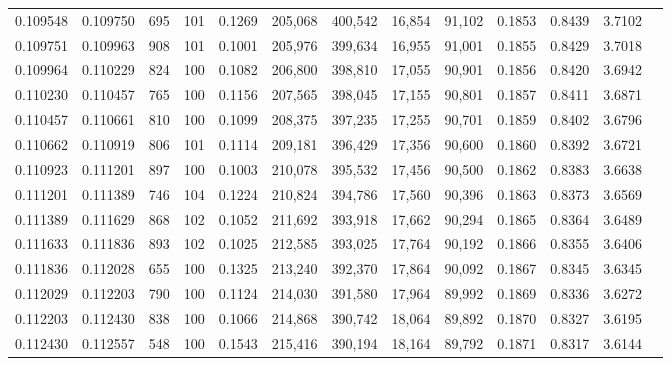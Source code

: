 \begin{tabular}{rrrrrrrrrrrrr}
0.109548 & 0.109750 &   695 & 101 &                                     0.1269 & 205,068 & 400,542 &  16,854 &  91,102 & 0.1853 & 0.8439 & 3.7102 \\
0.109751 & 0.109963 &   908 & 101 &                                     0.1001 & 205,976 & 399,634 &  16,955 &  91,001 & 0.1855 & 0.8429 & 3.7018 \\
0.109964 & 0.110229 &   824 & 100 &                                     0.1082 & 206,800 & 398,810 &  17,055 &  90,901 & 0.1856 & 0.8420 & 3.6942 \\
0.110230 & 0.110457 &   765 & 100 &                                     0.1156 & 207,565 & 398,045 &  17,155 &  90,801 & 0.1857 & 0.8411 & 3.6871 \\
0.110457 & 0.110661 &   810 & 100 &                                     0.1099 & 208,375 & 397,235 &  17,255 &  90,701 & 0.1859 & 0.8402 & 3.6796 \\
0.110662 & 0.110919 &   806 & 101 &                                     0.1114 & 209,181 & 396,429 &  17,356 &  90,600 & 0.1860 & 0.8392 & 3.6721 \\
0.110923 & 0.111201 &   897 & 100 &                                     0.1003 & 210,078 & 395,532 &  17,456 &  90,500 & 0.1862 & 0.8383 & 3.6638 \\
0.111201 & 0.111389 &   746 & 104 &                                     0.1224 & 210,824 & 394,786 &  17,560 &  90,396 & 0.1863 & 0.8373 & 3.6569 \\
0.111389 & 0.111629 &   868 & 102 &                                     0.1052 & 211,692 & 393,918 &  17,662 &  90,294 & 0.1865 & 0.8364 & 3.6489 \\
0.111633 & 0.111836 &   893 & 102 &                                     0.1025 & 212,585 & 393,025 &  17,764 &  90,192 & 0.1866 & 0.8355 & 3.6406 \\
0.111836 & 0.112028 &   655 & 100 &                                     0.1325 & 213,240 & 392,370 &  17,864 &  90,092 & 0.1867 & 0.8345 & 3.6345 \\
0.112029 & 0.112203 &   790 & 100 &                                     0.1124 & 214,030 & 391,580 &  17,964 &  89,992 & 0.1869 & 0.8336 & 3.6272 \\
0.112203 & 0.112430 &   838 & 100 &                                     0.1066 & 214,868 & 390,742 &  18,064 &  89,892 & 0.1870 & 0.8327 & 3.6195 \\
0.112430 & 0.112557 &   548 & 100 &                                     0.1543 & 215,416 & 390,194 &  18,164 &  89,792 & 0.1871 & 0.8317 & 3.6144 \\

\end{tabular}
